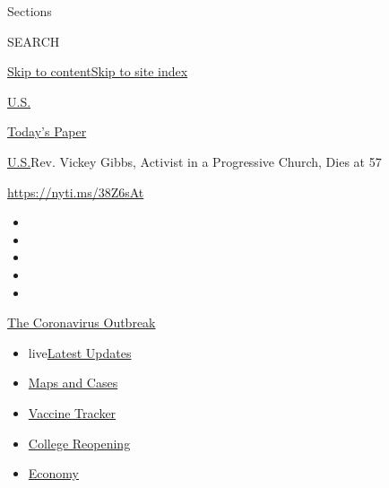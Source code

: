 Sections

SEARCH

\protect\hyperlink{site-content}{Skip to
content}\protect\hyperlink{site-index}{Skip to site index}

\href{https://www.nytimes3xbfgragh.onion/section/us}{U.S.}

\href{https://myaccount.nytimes3xbfgragh.onion/auth/login?response_type=cookie\&client_id=vi}{}

\href{https://www.nytimes3xbfgragh.onion/section/todayspaper}{Today's
Paper}

\href{/section/us}{U.S.}\textbar{}Rev. Vickey Gibbs, Activist in a
Progressive Church, Dies at 57

\url{https://nyti.ms/38Z6sAt}

\begin{itemize}
\item
\item
\item
\item
\item
\end{itemize}

\href{https://www.nytimes3xbfgragh.onion/news-event/coronavirus?action=click\&pgtype=Article\&state=default\&region=TOP_BANNER\&context=storylines_menu}{The
Coronavirus Outbreak}

\begin{itemize}
\tightlist
\item
  live\href{https://www.nytimes3xbfgragh.onion/2020/08/04/world/coronavirus-covid-19.html?action=click\&pgtype=Article\&state=default\&region=TOP_BANNER\&context=storylines_menu}{Latest
  Updates}
\item
  \href{https://www.nytimes3xbfgragh.onion/interactive/2020/us/coronavirus-us-cases.html?action=click\&pgtype=Article\&state=default\&region=TOP_BANNER\&context=storylines_menu}{Maps
  and Cases}
\item
  \href{https://www.nytimes3xbfgragh.onion/interactive/2020/science/coronavirus-vaccine-tracker.html?action=click\&pgtype=Article\&state=default\&region=TOP_BANNER\&context=storylines_menu}{Vaccine
  Tracker}
\item
  \href{https://www.nytimes3xbfgragh.onion/2020/08/02/us/covid-college-reopening.html?action=click\&pgtype=Article\&state=default\&region=TOP_BANNER\&context=storylines_menu}{College
  Reopening}
\item
  \href{https://www.nytimes3xbfgragh.onion/live/2020/08/03/business/stock-market-today-coronavirus?action=click\&pgtype=Article\&state=default\&region=TOP_BANNER\&context=storylines_menu}{Economy}
\end{itemize}

